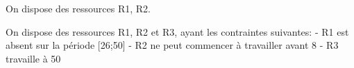 


On dispose des ressources R1, R2.



On dispose des ressources R1, R2 et R3, ayant les contraintes suivantes:
- R1 est absent sur la période [26;50]
- R2 ne peut commencer à travailler avant 8
- R3 travaille à 50%
